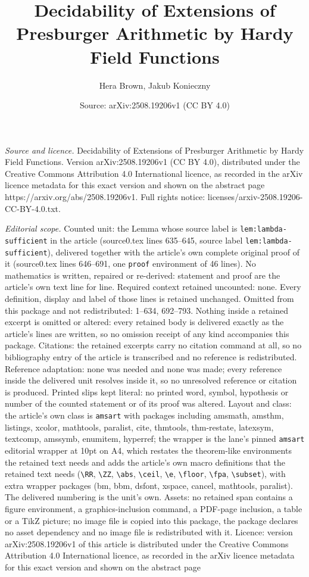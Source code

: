 \documentclass[10pt,a4paper]{amsart}
\title[Decidability of Extensions of Presburger Arithmetic by Hardy]{Decidability of Extensions of Presburger Arithmetic by Hardy Field Functions}
\author{Hera Brown, Jakub Konieczny}
\date{Source: arXiv:2508.19206v1 (CC BY 4.0)}
\begin{document}
\maketitle

\noindent\emph{Source and licence.} Decidability of Extensions of Presburger Arithmetic by Hardy Field Functions. Version arXiv:2508.19206v1 (CC BY 4.0), distributed under the Creative Commons Attribution 4.0 International licence, as recorded in the arXiv licence metadata for this exact version and shown on the abstract page https://arxiv.org/abs/2508.19206v1. Full rights notice: licenses/arxiv-2508.19206-CC-BY-4.0.txt.\par\smallskip

\noindent\textit{Editorial scope.} Counted unit: the Lemma whose source label is \texttt{lem:lambda-sufficient} in the article (source0.tex lines 635--645, source label \texttt{lem:lambda-sufficient}), delivered together with the article's own complete original proof of it (source0.tex lines 646--691, one \texttt{proof} environment of 46 lines). No mathematics is written, repaired or re-derived: statement and proof are the article's own text line for line. Required context retained uncounted: none. Every definition, display and label of those lines is retained unchanged. Omitted from this package and not redistributed: 1--634, 692--793. Nothing inside a retained excerpt is omitted or altered: every retained body is delivered exactly as the article's lines are written, so no omission receipt of any kind accompanies this package. Citations: the retained excerpts carry no citation command at all, so no bibliography entry of the article is transcribed and no reference is redistributed. Reference adaptation: none was needed and none was made; every reference inside the delivered unit resolves inside it, so no unresolved reference or citation is produced. Printed slips kept literal: no printed word, symbol, hypothesis or number of the counted statement or of its proof was altered. Layout and class: the article's own class is \texttt{amsart} with packages including amsmath, amsthm, listings, xcolor, mathtools, paralist, cite, thmtools, thm-restate, latexsym, textcomp, amssymb, enumitem, hyperref; the wrapper is the lane's pinned \texttt{amsart} editorial wrapper at 10pt on A4, which restates the theorem-like environments the retained text needs and adds the article's own macro definitions that the retained text needs (\texttt{\textbackslash RR}, \texttt{\textbackslash ZZ}, \texttt{\textbackslash abs}, \texttt{\textbackslash ceil}, \texttt{\textbackslash e}, \texttt{\textbackslash floor}, \texttt{\textbackslash fpa}, \texttt{\textbackslash subset}), with extra wrapper packages (bm, bbm, dsfont, xspace, cancel, mathtools, paralist). The delivered numbering is the unit's own. Assets: no retained span contains a figure environment, a graphics-inclusion command, a PDF-page inclusion, a table or a TikZ picture; no image file is copied into this package, the package declares no asset dependency and no image file is redistributed with it. Licence: version arXiv:2508.19206v1 of this article is distributed under the Creative Commons Attribution 4.0 International licence, as recorded in the arXiv licence metadata for this exact version and shown on the abstract page 
\end{document}
